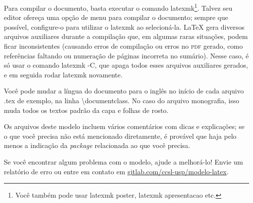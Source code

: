 \pagebreak[3]

Para compilar o documento, basta executar o comando
\textsf{latexmk}\footnote{Você também pode usar \textsf{latexmk poster},
\textsf{latexmk apresentacao} etc.}. Talvez seu editor ofereça uma opção
de menu para compilar o documento; sempre que possível, configure-o para
utilizar o \textsf{latexmk} ao selecioná-la. \LaTeX{} gera diversos arquivos
auxiliares durante a compilação que, em algumas raras situações, podem ficar
inconsistentes (causando erros de compilação ou erros no \textsc{pdf} gerado,
como referências faltando ou numeração de páginas incorreta no sumário).
Nesse caso, é só usar o comando \textsf{latexmk -C}, que apaga todos esses
arquivos auxiliares gerados, e em seguida rodar \textsf{latexmk} novamente.

Você pode mudar a língua do documento para o inglês no início de cada
arquivo .tex de exemplo, na linha \textsf{\textbackslash{}documentclass}.
No caso do arquivo \textsf{monografia}, isso muda todos os textos padrão
da capa e folhas de rosto.

Os arquivos deste modelo incluem vários comentários com dicas e explicações;
se o que você precisa não está mencionado diretamente, é provável que haja
pelo menos a indicação da \textit{package} relacionada ao que você precisa.

Se você encontrar algum problema com o modelo, ajude a melhorá-lo!
Envie um relatório de erro ou entre em contato em
\url{gitlab.com/ccsl-usp/modelo-latex}.

\enlargethispage{.8\baselineskip}
